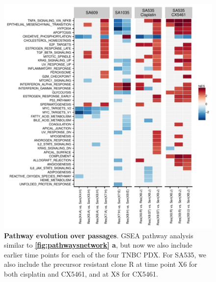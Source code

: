 \begin{figure}
\centering
 \includegraphics[width=\textwidth]{Figures/chap5/fig17_pathway_evolution.pdf}
\caption[Pathway evolution over passages]
	{\small
	 \textbf{Pathway evolution over passages}. GSEA pathway analysis similar to \textbf{\autoref{fig:pathwaysnetwork} a}, but now we also include earlier time points for each of the four TNBC PDX. For SA535, we also include the precursor resistant clone R at time point X6 for both cisplatin and CX5461, and at X8 for CX5461.
	 }

	\label{fig:pathwayevolution}
\end{figure}

